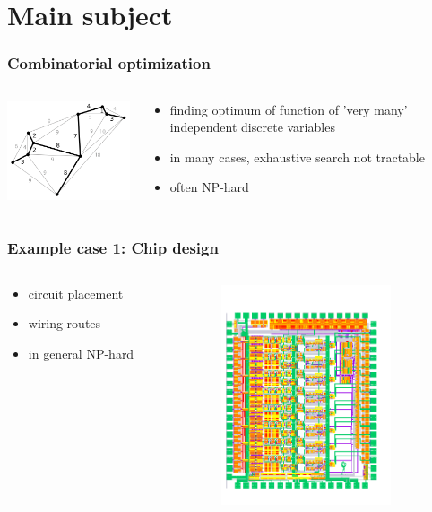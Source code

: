 \documentclass[aspectratio=43]{beamer}
\begin{document}
\section{Main subject}

\begin{frame}
	 \frametitle{Combinatorial optimization}
	 \begin{columns}[T]
		\begin{column}{0.5\textwidth}
			\includegraphics[width=5cm]{spanning_tree.png}\cite{Dcoetzee}	
		\end{column}
		\begin{column}{0.5\textwidth}
			\begin{itemize}
				\item finding optimum of function of \alert{'very many'} independent discrete variables
				\item in many cases, exhaustive search \alert{not tractable}
				\item often \alert{NP-hard}
			\end{itemize}
		\end{column}
	\end{columns}
\end{frame}

\begin{frame}
	 \frametitle{Example case 1: Chip design}
	 \begin{columns}[T]
		\begin{column}{0.5\textwidth}
			\begin{itemize}
				\item circuit placement
				\item wiring routes
				\item in general \alert{NP-hard}
			\end{itemize}	
		\end{column}
		\begin{column}{0.5\textwidth}
			\includegraphics[width=5cm]{floor_plan.png}\cite{Pipino}				
		\end{column}
	\end{columns}
\end{frame}
\end{document}
